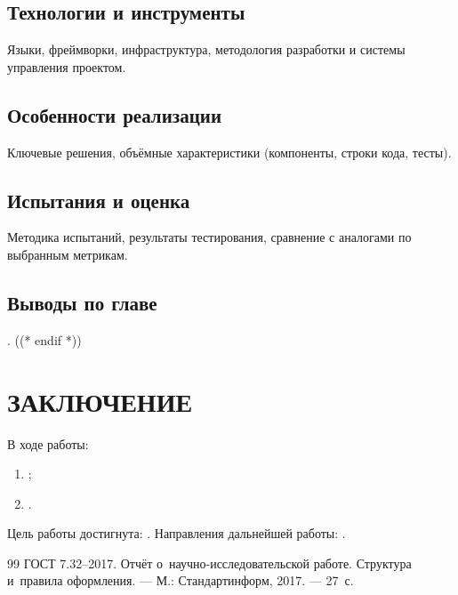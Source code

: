 \documentclass[12pt,a4paper]{extreport}
\begin{document}
\section{Технологии и инструменты}
Языки, фреймворки, инфраструктура, методология разработки и системы
управления проектом.

\section{Особенности реализации}
Ключевые решения, объёмные характеристики (компоненты, строки кода, тесты).

\section{Испытания и оценка}
Методика испытаний, результаты тестирования, сравнение с аналогами по
выбранным метрикам.

\section{Выводы по главе}
.
((* endif *))

\clearpage
\chapter*{ЗАКЛЮЧЕНИЕ}
В ходе работы:
\begin{enumerate}[label=\arabic*), leftmargin=1.25cm]
  \item {};
  \item {}.
\end{enumerate}
Цель работы достигнута: .
Направления дальнейшей работы: .

\clearpage
{}
\begin{thebibliography}{99}
  ГОСТ 7.32--2017. Отчёт о~научно-исследовательской работе. Структура и~правила оформления. --- М.: Стандартинформ, 2017. --- 27~с.
\end{thebibliography}
\end{document}
